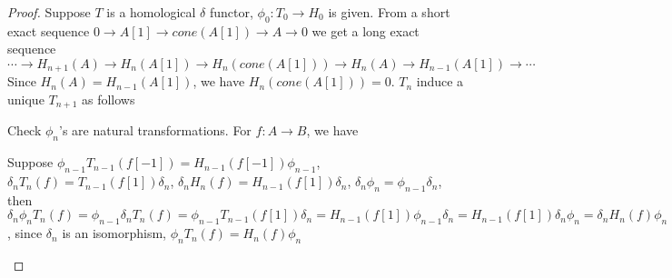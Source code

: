 \documentclass[../main.tex]{subfiles}
\begin{document}
\begin{proof}
Suppose $T$ is a homological $\delta$ functor, $\phi_0:T_0\to H_0$ is given. From a short exact sequence $0\to A[1]\to cone(A[1])\to A\to 0$ we get a long exact sequence
\[\cdots\to H_{n+1}(A)\to H_n(A[1])\to H_n(cone(A[1]))\to H_n(A)\to H_{n-1}(A[1])\to\cdots\]
Since $H_n(A)=H_{n-1}(A[1])$, we have $H_n(cone(A[1]))=0$. $T_n$ induce a unique $T_{n+1}$ as follows
\begin{center}
\end{center}
Check $\phi_n$'s are natural transformations. For $f:A\to B$, we have
\begin{center}
\end{center}
Suppose $\phi_{n-1}T_{n-1}(f[-1])=H_{n-1}(f[-1])\phi_{n-1}$, $\delta_nT_n(f)=T_{n-1}(f[1])\delta_n$, $\delta_nH_n(f)=H_{n-1}(f[1])\delta_n$, $\delta_n\phi_n=\phi_{n-1}\delta_n$, then $\delta_n\phi_nT_n(f)=\phi_{n-1}\delta_nT_n(f)=\phi_{n-1}T_{n-1}(f[1])\delta_n=H_{n-1}(f[1])\phi_{n-1}\delta_n=H_{n-1}(f[1])\delta_n\phi_n=\delta_nH_n(f)\phi_n$, since $\delta_n$ is an isomorphism, $\phi_nT_n(f)=H_n(f)\phi_n$
\begin{center}
\end{center}
\end{proof}
\end{document}
